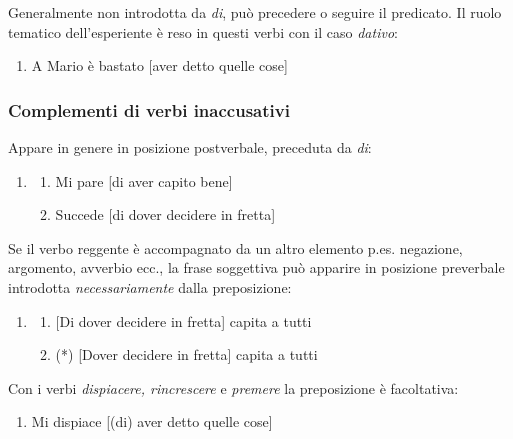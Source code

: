\documentclass[
  a4paper,
  twoside,
  11pt,
  chapterprefix=false,
  bibliography=totocnumbered,
  listof=flat]{scrbook}
\providecommand{\tightlist}{%
  \setlength{\itemsep}{0pt}\setlength{\parskip}{0pt}}
\begin{document}
Generalmente non introdotta da \emph{di}, può precedere o seguire il predicato.
Il ruolo tematico dell'esperiente è reso in questi verbi con il caso \emph{dativo}:

\begin{enumerate}
\def\labelenumi{(\arabic{enumi})}
\setcounter{enumi}{45}
\tightlist
\item
  A Mario è bastato {[}aver detto quelle cose{]}
\end{enumerate}

\hypertarget{complementi-di-verbi-inaccusativi}{%
\subsubsection{Complementi di verbi inaccusativi}\label{complementi-di-verbi-inaccusativi}}

Appare in genere in posizione postverbale, preceduta da \emph{di}:

\begin{enumerate}
\def\labelenumi{(\arabic{enumi})}
\setcounter{enumi}{46}
\item
  \begin{enumerate}
  \def\labelenumii{\alph{enumii}.}
  \tightlist
  \item
    Mi pare {[}di aver capito bene{]}
  \item
    Succede {[}di dover decidere in fretta{]}
  \end{enumerate}
\end{enumerate}

Se il verbo reggente è accompagnato da un altro elemento p.es. negazione, argomento, avverbio ecc., la frase soggettiva può apparire in posizione preverbale introdotta \emph{necessariamente} dalla preposizione:

\begin{enumerate}
\def\labelenumi{(\arabic{enumi})}
\setcounter{enumi}{47}
\item
  \begin{enumerate}
  \def\labelenumii{\alph{enumii}.}
  \tightlist
  \item
    {[}Di dover decidere in fretta{]} capita a tutti
  \item
    (*) {[}Dover decidere in fretta{]} capita a tutti
  \end{enumerate}
\end{enumerate}

Con i verbi \emph{dispiacere, rincrescere} e \emph{premere} la preposizione è facoltativa:

\begin{enumerate}
\def\labelenumi{(\arabic{enumi})}
\setcounter{enumi}{48}
\tightlist
\item
  Mi dispiace {[}(di) aver detto quelle cose{]}
\end{enumerate}
\end{document}
